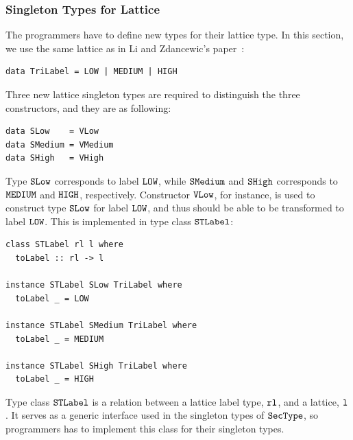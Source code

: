 \documentclass[a4paper]{report}
\newcommand{\co}[1]{$\cod{#1}$}
\begin{document}
\subsubsection{Singleton Types for Lattice}
The programmers have to define new types for their lattice type. In this section, we use the same lattice
as in Li and Zdancewic's paper~\cite{Li:Zdancewic:CSFW}:
\begin{Verbatim}[fontsize=\footnotesize]
data TriLabel = LOW | MEDIUM | HIGH
\end{Verbatim}
Three new lattice singleton types are required to distinguish the three constructors, and they are as following:
\begin{Verbatim}[fontsize=\footnotesize]
data SLow    = VLow
data SMedium = VMedium
data SHigh   = VHigh
\end{Verbatim}
Type \co{SLow} corresponds to label \co{LOW}, while \co{SMedium} and \co{SHigh} corresponds to
\co{MEDIUM} and \co{HIGH}, respectively. 
Constructor
\co{VLow}, for instance, is used to construct type \co{SLow} for label \co{LOW}, and thus
should be able to be transformed to label \co{LOW}. 
This is implemented in type class \co{STLabel}:
\begin{Verbatim}[fontsize=\footnotesize]
class STLabel rl l where
  toLabel :: rl -> l

instance STLabel SLow TriLabel where
  toLabel _ = LOW

instance STLabel SMedium TriLabel where
  toLabel _ = MEDIUM

instance STLabel SHigh TriLabel where
  toLabel _ = HIGH
\end{Verbatim}
Type class \co{STLabel} is a relation between a lattice label type, \co{rl}, and a lattice, \co{l}.
It serves as a generic interface used in the singleton types of \co{SecType}, so programmers
has to implement this class for their singleton types.
\end{document}
